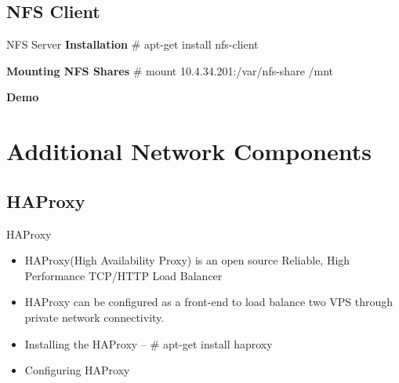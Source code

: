\documentclass[10pt,xcolor=dvipsnames]{beamer}
\begin{document}
\subsection{NFS Client}
\begin{frame}{NFS Server}
\textbf{Installation} \newline
\# apt-get install nfs-client \newline

\textbf{Mounting NFS Shares} \newline
\# mount 10.4.34.201:/var/nfs-share /mnt

\end{frame}

\begin{frame}
\begin{center}
\textbf{Demo}
\end{center}
\end{frame}

\section{Additional Network Components}


\subsection{HAProxy}
\begin{frame}{HAProxy}
\begin{itemize}
\item HAProxy(High Availability Proxy) is an open source Reliable, High Performance TCP/HTTP Load Balancer
\item HAProxy can be configured as a front-end to load balance two VPS through private network connectivity.
\item Installing the HAProxy -- \# apt-get install haproxy
\item Configuring HAProxy 
\end{itemize}

\end{frame}
\end{document}
